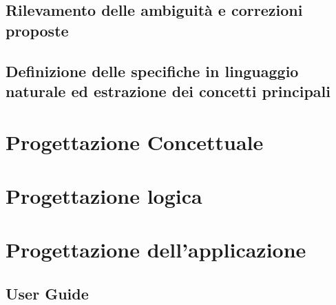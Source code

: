 \documentclass{article}
\begin{document}
\subsection{Rilevamento delle ambiguità e correzioni proposte}

\newpage
\subsection{Definizione delle specifiche in linguaggio naturale ed estrazione dei concetti principali}

\newpage
\section{Progettazione Concettuale}

\newpage
\section{Progettazione logica}

\newpage
\section{Progettazione dell'applicazione}
\subsection{User Guide}
\end{document}
